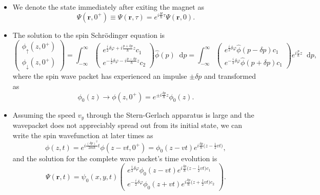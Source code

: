 \documentclass[11pt, a4paper]{article}
\newcommand{\diff}{\mathop{}\!\mathrm{d}} %
\newcommand{\Schro}{Schr\"{o}dinger\xspace}
\newcommand{\SG}{Stern-Gerlach\xspace}
\renewcommand{\vec}[1]{\bm{#1}}  %
\newcommand{\F}[1]{\widehat{#1}} %
\newcommand{\ua}{\uparrow}  %
\newcommand{\da}{\downarrow}  %
\renewcommand{\r}{\vec{r}}  %
\begin{document}
\begin{itemize}
    \item We denote the state immediately after exiting the magnet as
    \begin{equation*}
        \Psi(\r, 0^{+}) \equiv \Psi(\r, \tau) = e^{i \frac{H}{\hbar}\tau}\Psi(\r, 0).
    \end{equation*}

    \item The solution to the spin \Schro equation is
    \begin{equation*}
        \begin{pmatrix}
            \phi_{\ua}(z, 0^{+})\\
            \phi_{\da}(z, 0^{+})
        \end{pmatrix}
        = \int_{-\infty}^{\infty}
        \begin{pmatrix}
            e^{\frac{i}{2}\delta\varphi + i \frac{p + \delta p}{\hbar}z}c_{1}\\
            e^{-\frac{i}{2}\delta\varphi - i \frac{p - \delta p}{\hbar}z}c_{2}
        \end{pmatrix}
        \F{\phi}(p)\diff p
        = \int_{-\infty}^{\infty}
        \begin{pmatrix}
            e^{\frac{i}{2}\delta\varphi}\F{\phi}(p - \delta p)c_{1}\\
            e^{-\frac{i}{2}\delta\varphi}\F{\phi}(p + \delta p)c_{1}
        \end{pmatrix} 
        e^{i \frac{p}{\hbar}z}\diff p,
    \end{equation*}
    where the spin wave packet has experienced an impulse $ \pm \delta p $ and transformed as
    \begin{equation*}
        \phi_{0}(z) \to \phi(z, 0^{+}) = e^{\pm i \frac{\delta p}{\hbar}z}\phi_{0}(z).
    \end{equation*}
    
    \item Assuming the speed $ v_{y} $ through the \SG apparatus is large and the wavepacket does not appreciably spread out from its initial state, we can write the spin wavefunction at later times as
    \begin{equation*}
        \phi(z, t) = e^{ i \frac{(\delta p)^{2}}{2m \hbar}t} \phi(z - vt, 0^{+}) = \phi_{0}(z - vt)e^{i \frac{\delta p}{\hbar}\big( z - \frac{1}{2}vt \big)},
    \end{equation*}
    and the solution for the complete wave packet's time evolution is
    \begin{equation*}
        \Psi(\r, t) = \psi_{0}(x, y, t)
        \begin{pmatrix}
            e^{\frac{i}{2}\delta \varphi}\phi_{0}(z - vt)e^{i \frac{\delta p}{\hbar}\big( z - \frac{1}{2}vt \big)c_{1}}\\
            e^{-\frac{i}{2}\delta \varphi}\phi_{0}(z + vt)e^{i \frac{\delta p}{\hbar}\big( z + \frac{1}{2}vt \big)c_{2}}
        \end{pmatrix}.
    \end{equation*}
    
\end{itemize}
\end{document}

